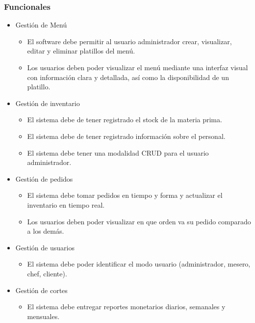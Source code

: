 \documentclass[a4paper,12pt]{article}
\begin{document}
	\subsubsection{Funcionales}
	\begin{itemize}
		\item Gestión de Menú
		\begin{itemize}
			\item El software debe permitir al usuario administrador crear, visualizar, editar y eliminar platillos del menú.
			\item Los usuarios deben poder visualizar el menú mediante una interfaz visual con información clara y detallada, así como la disponibilidad de un platillo.
		\end{itemize}
		\item Gestión de inventario
		\begin{itemize}
			\item El sistema debe de tener registrado el stock de la materia prima.
			\item El sistema debe de tener registrado información sobre el personal.
			\item El sistema debe tener una modalidad CRUD para el usuario administrador.
		\end{itemize}
		
		\item Gestión de pedidos
		\begin{itemize}
			\item El sistema debe tomar pedidos en tiempo y forma y actualizar el inventario en tiempo real.
			\item Los usuarios deben poder visualizar en que orden va su pedido comparado a los demás.
		\end{itemize}
		
		\item Gestión de usuarios
		\begin{itemize}
			\item El sistema debe poder identificar el modo usuario (administrador, mesero, chef, cliente).
		\end{itemize}
		
		\item Gestión de cortes
		\begin{itemize}
			\item El sistema debe entregar reportes monetarios diarios, semanales y mensuales.
		\end{itemize}
		
	\end{itemize}
	
\end{document}
